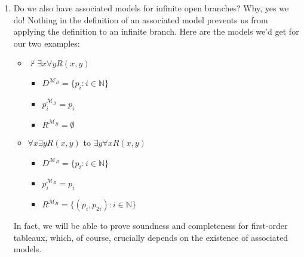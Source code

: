 \begin{enumerate}[\thesection.1]
	\item Do we also have associated models for infinite open branches? Why, yes we do! Nothing in the definition of an associated model prevents us from applying the definition to an infinite branch. Here are the models we'd get for our two examples:
	
	\begin{itemize}
	
		\item $\nvdash\exists x\forall yR(x,y)$
		
			\begin{itemize}
			
				\item $D^{\mathcal{M}_B}=\{p_i:i\in\mathbb{N}\}$
				
				\item $p_i^{\mathcal{M}_B}=p_i$
				
				\item $R^{\mathcal{M}_B}=\emptyset$
			
			\end{itemize}
			
		\item $\forall x\exists yR(x,y)$ to $\exists y\forall xR(x,y)$
				
			\begin{itemize}
			
				\item $D^{\mathcal{M}_B}=\{p_i:i\in\mathbb{N}\}$
				
				\item $p_i^{\mathcal{M}_B}=p_i$
				
				\item $R^{\mathcal{M}_B}=\{(p_i, p_{2i}):i\in \mathbb{N}\}$
			
			\end{itemize}	
	\end{itemize}
				In fact, we will be able to prove soundness and completeness for first-order tableaux, which, of course, crucially depends on the existence of associated models. 


\end{enumerate}
